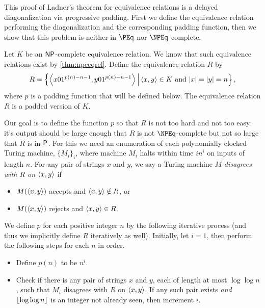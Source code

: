This proof of Ladner's theorem for equivalence relations is a delayed diagonalization via progressive padding.
First we define the equivalence relation performing the diagonalization and the corresponding padding function, then we show that this problem is neither in $\PEq$ nor $\NPEq$-complete.

\begin{construction}\label{con:diag}
  Let $K$ be an $\NP$-complete equivalence relation.
  We know that such equivalence relations exist by \autoref{thm:npceqrel}.
  Define the equivalence relation $R$ by
  \begin{equation*}
    R = \left\{\left\langle x 0 1^{p(n) - n - 1}, y 0 1^{p(n) - n - 1}\right\rangle \, \middle| \, \pair{x}{y} \in K \text{ and } |x| = |y| = n\right\},
  \end{equation*}
  where $p$ is a padding function that will be defined below.
  The equivalence relation $R$ is a padded version of $K$.

  Our goal is to define the function $p$ so that $R$ is not too hard and not too easy: it's output should be large enough that $R$ is not $\NPEq$-complete but not so large that $R$ is in $\P$.
  For this we need an enumeration of each polynomially clocked Turing machine, $\{M_i\}_i$, where machine $M_i$ halts within time $i n^i$ on inputs of length $n$.
  For any pair of strings $x$ and $y$, we say a Turing machine $M$ \emph{disagrees with $R$ on $\pair{x}{y}$} if
  \begin{itemize}
  \item $M(\pair{x}{y})$ accepts and $\pair{x}{y} \notin R$, or
  \item $M(\pair{x}{y})$ rejects and $\pair{x}{y} \in R$.
  \end{itemize}
  We define $p$ for each positive integer $n$ by the following iterative process (and thus we implicitly define $R$ iteratively as well).
  Initially, let $i = 1$, then perform the following steps for each $n$ in order.
  \begin{itemize}
  \item Define $p(n)$ to be $n^i$.
  \item
    Check if there is any pair of strings $x$ and $y$, each of length at most $\log \log n$, such that $M_i$ disagrees with $R$ on $\pair{x}{y}$.
    If any such pair exists \emph{and} $\floor{\log \log n}$ is an integer not already seen, then increment $i$.\qedhere
  \end{itemize}
\end{construction}


